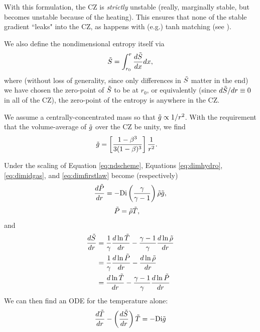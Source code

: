 \documentclass[12pt]{article}
\numberwithin{equation}{section}
\begin{document}
With this formulation, the CZ is \textit{strictly} unstable (really, marginally stable, but becomes unstable because of the heating). This ensures that none of the stable gradient ``leaks" into the CZ, as happens with (e.g.) tanh matching (see \citealt{Matilsky2024}). 

We also define the nondimensional entropy itself via
\begin{align}
	\tilde{S} = \int_{r_0}^r \frac{d\tilde{S}}{dx}dx,
\end{align}
where (without loss of generality, since only differences in $\tilde{S}$ matter in the end) we have chosen the zero-point of $\tilde{S}$ to be at $r_0$, or equivalently (since $d\tilde{S}/dr\equiv0$ in all of the CZ), the zero-point of the entropy is anywhere in the CZ.  

We assume a centrally-concentrated mass so that $\tilde{g}\propto 1/r^2$. With the requirement that the volume-average of $\tilde{g}$ over the CZ be unity, we find
\begin{align}
	\tilde{g} &= \left[ \frac{1-\beta^3}{3(1-\beta)^3}    \right]\frac{1}{r^2}.
\end{align}

Under the scaling of Equation \eqref{eq:ndscheme}, Equations \eqref{eq:dimhydro}, \eqref{eq:dimidgas}, and \eqref{eq:dimfirstlaw} become (respectively)
\begin{align}\label{eq:hydro}
	\frac{d\tilde{P}}{dr}= -{\rm{Di}}\left(\frac{\gamma}{\gamma-1}\right)\tilde{\rho} \tilde{g},
\end{align}
\begin{align}
	\tilde{P} &= \tilde{\rho} \tilde{T},\label{eq:idgas}
\end{align}
and
\begin{subequations}\label{eq:firstlaw}
	\begin{align}
		\frac{d\tilde{S}}{dr}&=\frac{1}{\gamma}\frac{d\ln\tilde{T}}{dr} - \frac{\gamma - 1}{\gamma}\frac{d\ln\tilde{\rho}}{dr}\label{eq:firstlawtmprho}\\
		&=\frac{1}{\gamma}\frac{d\ln\tilde{P}}{dr} - \frac{d\ln\tilde{\rho}}{dr}\label{eq:firstlawprsrho}\\
		&= \frac{d\ln\tilde{T}}{dr} - \frac{\gamma - 1}{\gamma}\frac{d\ln\tilde{P}}{dr}\label{eq:firstlawtmpprs}
	\end{align}
\end{subequations}
We can then find an ODE for the temperature alone:
\begin{align}
	\frac{d\tilde{T}}{dr}-\left(\frac{d\tilde{S}}{dr}\right)\tilde{T} = - {\rm{Di}} \tilde{g}
\end{align}
\end{document}

